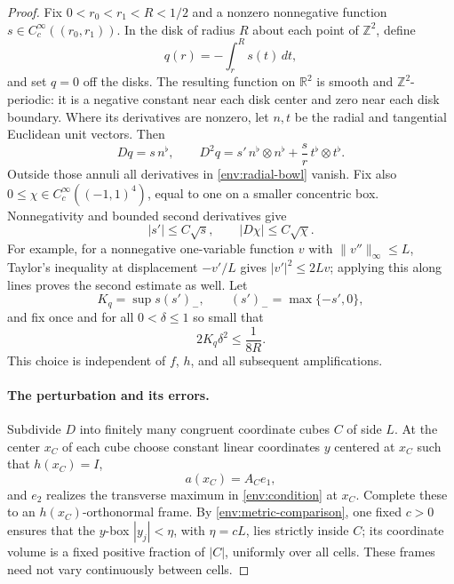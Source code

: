 \begin{proof}
Fix $0<r_0<r_1<R<1/2$ and a nonzero nonnegative function
$s\in C_c^\infty((r_0,r_1))$. In the disk of radius $R$ about each
point of $\mathbb Z^2$, define
\[
 q(r)=-\int_r^R s(t)\,dt,
\]
and set $q=0$ off the disks. The resulting function on $\mathbb R^2$
is smooth and $\mathbb Z^2$-periodic: it is a negative constant near
each disk center and zero near each disk boundary. Where its derivatives
are nonzero, let $n,t$ be the radial and tangential Euclidean unit
vectors. Then
\begin{equation}\label{env:radial-bowl}
 Dq=s\,n^\flat,\qquad
 D^2q=s'\,n^\flat\otimes n^\flat
             +\frac{s}{r}\,t^\flat\otimes t^\flat.
\end{equation}
Outside those annuli all derivatives in \eqref{env:radial-bowl} vanish.
Fix also $0\le\chi\in C_c^\infty((-1,1)^4)$, equal to one on a
smaller concentric box. Nonnegativity and bounded second derivatives
give
\begin{equation}\label{env:bump-estimates}
 |s'|\le C\sqrt{s},\qquad |D\chi|\le C\sqrt{\chi}.
\end{equation}
For example, for a nonnegative one-variable function $v$ with
$\|v''\|_\infty\le L$, Taylor's inequality at displacement
$-v'/L$ gives $|v'|^2\le2Lv$; applying this along lines proves the
second estimate as well. Let
\[
 K_q=\sup s(s')_-,\qquad (s')_-=\max\{-s',0\},
\]
and fix once and for all $0<\delta\le1$ so small that
\begin{equation}\label{env:fixed-delta}
 2K_q\delta^2\le\frac1{8R}.
\end{equation}
This choice is independent of $f$, $h$, and all subsequent amplifications.

\paragraph{The perturbation and its errors.}
Subdivide $D$ into finitely many congruent coordinate cubes $C$ of
side $L$. At the center $x_C$ of each cube choose constant linear
coordinates $y$ centered at $x_C$ such that $h(x_C)=I$,
\[
 a(x_C)=A_Ce_1,
\]
and $e_2$ realizes the transverse maximum in \eqref{env:condition}
at $x_C$. Complete these to an $h(x_C)$-orthonormal frame. By
\eqref{env:metric-comparison}, one fixed $c>0$ ensures that the
$y$-box $|y_j|<\eta$, with $\eta=cL$, lies strictly inside $C$;
its coordinate volume is a fixed positive fraction of $|C|$, uniformly
over all cells. These frames need not vary continuously between cells.


\end{proof}
